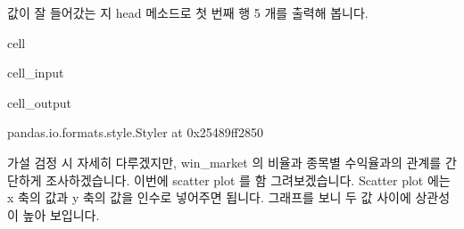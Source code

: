 \documentclass[letterpaper,10pt,english]{jupyterBook}
\begin{document}
\sphinxAtStartPar
 값이 잘 들어갔는 지 head 메소드로 첫 번째 행 5 개를 출력해 봅니다.

\begin{sphinxuseclass}{cell}\begin{sphinxVerbatimInput}

\begin{sphinxuseclass}{cell_input}
\begin{sphinxVerbatim}[commandchars=\\\{\}]
    
\end{sphinxVerbatim}

\end{sphinxuseclass}\end{sphinxVerbatimInput}
\begin{sphinxVerbatimOutput}

\begin{sphinxuseclass}{cell_output}
\begin{sphinxVerbatim}[commandchars=\\\{\}]
\PYGZlt{}pandas.io.formats.style.Styler at 0x25489ff2850\PYGZgt{}
\end{sphinxVerbatim}

\end{sphinxuseclass}\end{sphinxVerbatimOutput}

\end{sphinxuseclass}
\sphinxAtStartPar
가설 검정 시 자세히 다루겠지만, win\_market 의 비율과 종목별 수익율과의 관계를 간단하게 조사하겠습니다. 이번에 scatter plot 를 함 그려보겠습니다. Scatter plot 에는 x 축의 값과 y 축의 값을 인수로 넣어주면 됩니다. 그래프를 보니 두 값 사이에 상관성이 높아 보입니다.
\end{document}
